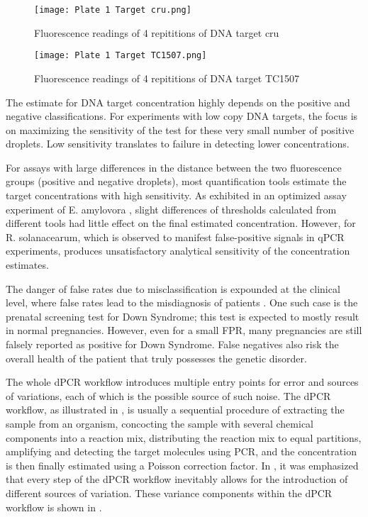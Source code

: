 \begin{figure}[h]
    \centering
    \texttt{[image: Plate 1 Target cru.png]}
    \caption{Fluorescence readings of 4 repititions of DNA target cru}
        \label{fig:plate1cru}
\end{figure}

\begin{figure}[h]
    \centering
    \texttt{[image: Plate 1 Target TC1507.png]}
    \caption{Fluorescence readings of 4 repititions of DNA target TC1507}
        \label{fig:plate1tc1507}
\end{figure}

The estimate for DNA target concentration highly depends on the positive and negative classifications. For experiments with low copy DNA targets, the focus is on maximizing the sensitivity of the test for these very small number of positive droplets. Low sensitivity translates to failure in detecting lower concentrations. 

For assays with large differences in the distance between the two fluorescence groups (positive and negative droplets), most quantification tools estimate the target concentrations with high sensitivity. As exhibited in an optimized assay experiment of E. amylovora \cite{Dreo2014}, slight differences of thresholds calculated from different tools had little effect on the final estimated concentration. However, for R. solanacearum, which is observed to manifest false-positive signals in qPCR experiments, produces unsatisfactory analytical sensitivity of the concentration estimates. 

The danger of false rates due to misclassification is expounded at the clinical level, where false rates lead to the misdiagnosis of patients \cite{Tzonev2018}. One such case is the prenatal screening test for Down Syndrome; this test is expected to mostly result in normal pregnancies. However, even for a small FPR, many pregnancies are still falsely reported as positive for Down Syndrome. False negatives also risk the overall health of the patient that truly possesses the genetic disorder.

The whole dPCR workflow introduces multiple entry points for error and sources of variations, each of which is the possible source of such noise. The dPCR workflow, as illustrated in , is usually a sequential procedure of extracting the sample from an organism, concocting the sample with several chemical components into a reaction mix, distributing the reaction mix to equal partitions, amplifying and detecting the target molecules using PCR, and the concentration is then finally estimated using a Poisson correction factor. In \cite{Jacobs2014}, it was emphasized that every step of the dPCR workflow inevitably allows for the introduction of different sources of variation. These variance components within the dPCR workflow is shown in . 

